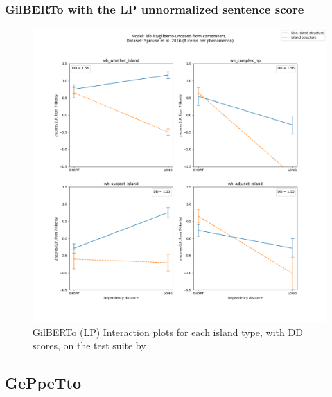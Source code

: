 \subsubsection{GilBERTo with the LP unnormalized sentence score}
\begin{figure}[h]
	\centering
	\includegraphics[width=1\textwidth]{images/Chapter1/Sprouse_wh_idb-ita_gilberto-uncased-from-camembert_LP-zscores-likert-2022-09-16_h10m19s47.png} 
	\caption{GilBERTo (LP) Interaction plots for each island type, with DD scores, on the test suite by \citet{sprouse2016experimental}}
	\label{fig:sprouse_gilbertot_lp} 
	\medskip
\end{figure}	

\clearpage
\subsection{GePpeTto}
